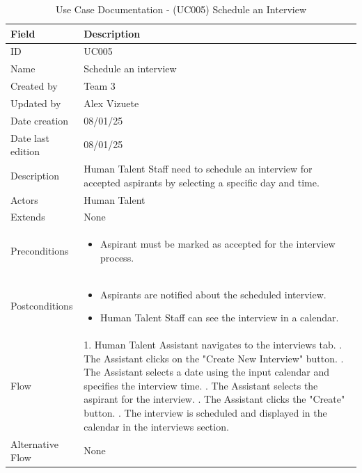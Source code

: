 \documentclass{scrreprt}
\begin{document}
\begin{table}[H]
	\centering
	\begin{tabular}{|p{3cm}|p{10cm}|}
		\hline
		\textbf{Field} & \textbf{Description} \\ \hline
		ID & UC005 \\ \hline
		Name & Schedule an interview \\ \hline
		Created by & Team 3 \\ \hline
		Updated by & Alex Vizuete \\ \hline
		Date creation & 08/01/25 \\ \hline
		Date last edition & 08/01/25 \\ \hline
		Description & Human Talent Staff need to schedule an interview for accepted aspirants by selecting a specific day and time. \\ \hline
		Actors & Human Talent \\ \hline
		Extends & None \\ \hline
		Preconditions & 
		\begin{itemize}
			\item Aspirant must be marked as accepted for the interview process.
		\end{itemize} \\ \hline
		Postconditions & 
		\begin{itemize}
			\item Aspirants are notified about the scheduled interview.
			\item Human Talent Staff can see the interview in a calendar.
		\end{itemize} \\ \hline
		Flow & 
		1. Human Talent Assistant navigates to the interviews tab. \newline
		2. The Assistant clicks on the "Create New Interview" button. \newline
		3. The Assistant selects a date using the input calendar and specifies the interview time. \newline
		4. The Assistant selects the aspirant for the interview. \newline
		5. The Assistant clicks the "Create" button. \newline
		6. The interview is scheduled and displayed in the calendar in the interviews section. \\ \hline
		Alternative Flow & None \\ \hline
	\end{tabular}
	\caption{Use Case Documentation - (UC005) Schedule an Interview}
	\label{table:UC005}
\end{table}
\end{document}
